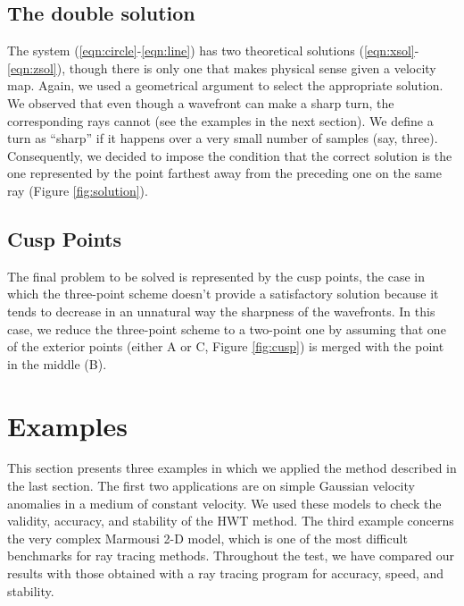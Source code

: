 \subsection{The double solution}

The system (\ref{eqn:circle}-\ref{eqn:line}) has two theoretical
solutions (\ref{eqn:xsol}-\ref{eqn:zsol}), though there is only one
that makes physical sense given a velocity map. Again, we used a
geometrical argument to select the appropriate solution. We observed 
that even though a wavefront can make a sharp turn, the corresponding
rays cannot (see the examples in the next section). We define a
turn as ``sharp'' if it happens over a very small number of samples (say,
three). Consequently, we decided to impose the condition that the correct
solution is the one represented by the point farthest away from the
preceding one on the same ray (Figure \ref{fig:solution}).

\subsection{Cusp Points}
   
The final problem to be solved is represented by the cusp
points, the case in which the three-point scheme doesn't provide a
satisfactory solution because it tends to decrease in an
unnatural way the sharpness of the wavefronts. In this case, we reduce
the three-point scheme to a two-point one by assuming that one of the
exterior points (either A or C, Figure \ref{fig:cusp}) is merged with
the point in the middle (B).


\section{Examples}

This section presents three examples in which we applied the method
described in the last section. The first two applications are on
simple Gaussian velocity anomalies in a medium of constant velocity. We used
these models to check the validity, accuracy, and stability of the HWT
method. The third example concerns the very complex Marmousi 2-D
model, which is one of the most difficult benchmarks for ray tracing
methods. Throughout the test, we have compared our results with those
obtained with a ray tracing program
for accuracy,
speed, and stability.

